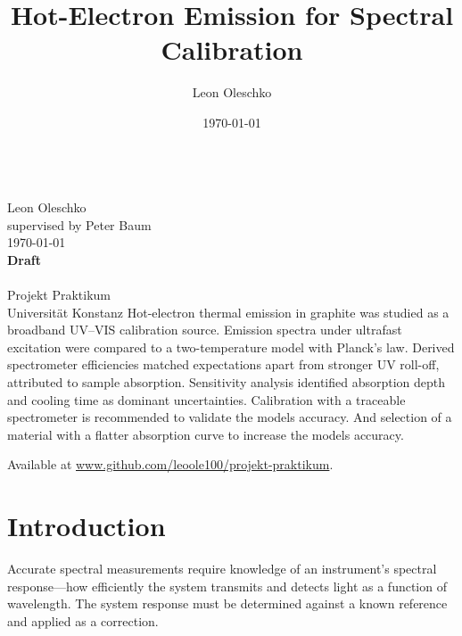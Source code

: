\documentclass[
	parskip=half,
	a4paper,
]{scrarticle}
\begin{document}
\title{Hot-Electron Emission for Spectral Calibration}
\author{Leon Oleschko}
\date{\dotdate\today}

\begin{titlepage}
    \sffamily
    \vspace*{3cm}
    {
        \fontsize{32}{32}
    }
    \vspace{.25cm}\\
    {
        \Large
        Leon Oleschko\\
        supervised by Peter Baum
        \vspace{.05cm}\\
        \dotdate\today\\
        \textbf{Draft}\\
        \vspace{.05cm}\\
        \normalsize
        Projekt Praktikum\\
        Universität Konstanz
    }
    \vfill
    {
        \normalfont\normalsize
        Hot-electron thermal emission in graphite was studied as a broadband UV–VIS calibration source. Emission spectra under ultrafast excitation were compared to a two-temperature model with Planck’s law. Derived spectrometer efficiencies matched expectations apart from stronger UV roll-off, attributed to sample absorption. Sensitivity analysis identified absorption depth and cooling time as dominant uncertainties. Calibration with a traceable spectrometer is recommended to validate the models accuracy. And selection of a material with a flatter absorption curve to increase the models accuracy.
    }
    \vfill
    \begin{flushright}
        Available at \url{www.github.com/leoole100/projekt-praktikum}.
    \end{flushright}
\end{titlepage}


\clearpage

\section{Introduction}
Accurate spectral measurements require knowledge of an instrument’s spectral response—how efficiently the system transmits and detects light as a function of wavelength. The system response must be determined against a known reference and applied as a correction.
\end{document}
